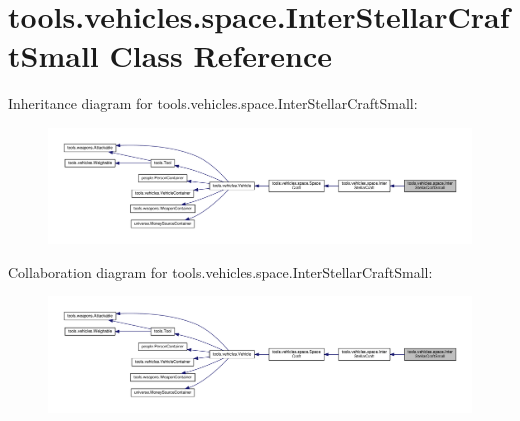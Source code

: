 \hypertarget{classtools_1_1vehicles_1_1space_1_1_inter_stellar_craft_small}{}\section{tools.\+vehicles.\+space.\+Inter\+Stellar\+Craft\+Small Class Reference}
\label{classtools_1_1vehicles_1_1space_1_1_inter_stellar_craft_small}


Inheritance diagram for tools.\+vehicles.\+space.\+Inter\+Stellar\+Craft\+Small\+:
\nopagebreak
\begin{figure}[H]
\begin{center}
\leavevmode
\includegraphics[width=350pt]{classtools_1_1vehicles_1_1space_1_1_inter_stellar_craft_small__inherit__graph}
\end{center}
\end{figure}


Collaboration diagram for tools.\+vehicles.\+space.\+Inter\+Stellar\+Craft\+Small\+:
\nopagebreak
\begin{figure}[H]
\begin{center}
\leavevmode
\includegraphics[width=350pt]{classtools_1_1vehicles_1_1space_1_1_inter_stellar_craft_small__coll__graph}
\end{center}
\end{figure}
